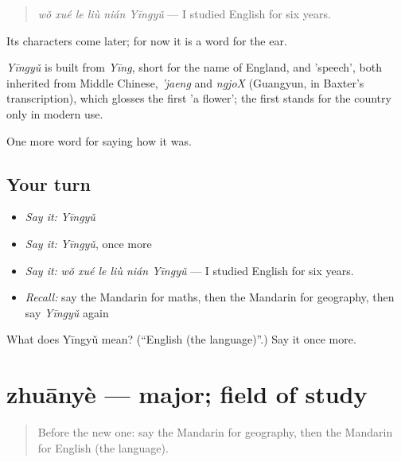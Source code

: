 \begin{quote}
\emph{wǒ xué le liù nián Yīngyǔ} — I studied English for six years.
\end{quote}

Its characters come later; for now it is a word for the ear.

\begin{cousinweb}
\emph{Yīngyǔ} is built from \emph{Yīng}, short for the name of England, and  'speech', both inherited from Middle Chinese, \emph{'jaeng} and \emph{ngjoX} (Guangyun, in Baxter's transcription), which glosses the first 'a flower'; the first stands for the country only in modern use.
\end{cousinweb}

\begin{grammarlens}[title={What you've built}]
One more word for saying how it was.
\end{grammarlens}

\subsection*{Your turn}
\begin{itemize}
\raggedright
  \item \emph{Say it:} \emph{Yīngyǔ}
  \item \emph{Say it:} \emph{Yīngyǔ}, once more
  \item \emph{Say it:} \emph{wǒ xué le liù nián Yīngyǔ} — I studied English for six years.
  \item \emph{Recall:} say the Mandarin for maths, then the Mandarin for geography, then say \emph{Yīngyǔ} again
\end{itemize}

\begin{tcolorbox}[breakable,colback=teal!4,colframe=teal!35!black,title={Before you move on}]
What does Yīngyǔ mean? (\textquotedblleft{}English (the language)\textquotedblright{}.) Say it once more.
\end{tcolorbox}
\section[zhuānyè]{zhuānyè — major; field of study}

\label{lesson:ZH-C492-zhuanye}



\begin{quote}
Before the new one: say the Mandarin for geography, then the Mandarin for English (the language).
\end{quote}


